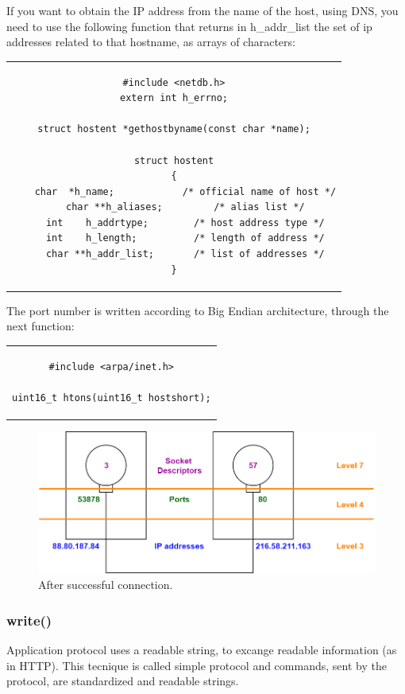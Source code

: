 If you want to obtain the IP address from the name of the host, using DNS, you need to use the following function that returns in h\_addr\_list the set of ip addresses related to that hostname, as arrays of characters:
\begin{center}
\begin{tabular}{c}
\begin{lstlisting}[linewidth=300pt, basicstyle=\footnotesize\sffamily,]
#include <netdb.h>
extern int h_errno;

struct hostent *gethostbyname(const char *name);

struct hostent
{
    char  *h_name;            /* official name of host */
    char **h_aliases;         /* alias list */
    int    h_addrtype;        /* host address type */
    int    h_length;          /* length of address */
    char **h_addr_list;       /* list of addresses */
}
\end{lstlisting}
\end{tabular}
\end{center}

The port number is written according to Big Endian architecture, through the next function:
\begin{center}
\begin{tabular}{c}
\begin{lstlisting}[linewidth=200pt, basicstyle=\footnotesize\sffamily,]
#include <arpa/inet.h>

uint16_t htons(uint16_t hostshort);
\end{lstlisting}
\end{tabular}
\end{center}
\begin{figure}[h]
\centering
\includegraphics[scale=0.4]{Images/NetworkC/addresses}\caption{\footnotesize{After successful connection.}}\label{addresses}
\end{figure}

\subsubsection{write()}
Application protocol uses a readable string, to excange readable information (as in HTTP). This tecnique is called simple protocol and commands, sent by the protocol, are standardized and readable strings.  

